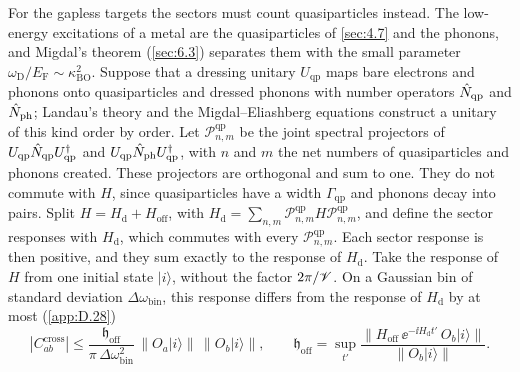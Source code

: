 For the gapless targets the sectors must count quasiparticles instead. The low-energy excitations of a metal are the quasiparticles of \cref{sec:4.7} and the phonons, and Migdal's theorem (\cref{sec:6.3}) separates them with the small parameter $\omega_{\mathrm{D}}/E_{\mathrm{F}} \sim \kappa_{\mathrm{BO}}^2$. Suppose that a dressing unitary $U_{\mathrm{qp}}$ maps bare electrons and phonons onto quasiparticles and dressed phonons with number operators $\hat{N}_{\mathrm{qp}}$ and $\hat{N}_{\mathrm{ph}}$; Landau's theory and the Migdal--Eliashberg equations construct a unitary of this kind order by order. Let $\mathcal{P}^{\mathrm{qp}}_{n,m}$ be the joint spectral projectors of $U_{\mathrm{qp}}\hat{N}_{\mathrm{qp}}U_{\mathrm{qp}}^\dagger$ and $U_{\mathrm{qp}}\hat{N}_{\mathrm{ph}}U_{\mathrm{qp}}^\dagger$, with $n$ and $m$ the net numbers of quasiparticles and phonons created. These projectors are orthogonal and sum to one. They do not commute with $H$, since quasiparticles have a width $\varGamma_{\mathrm{qp}}$ and phonons decay into pairs. Split $H = H_{\mathrm{d}} + H_{\mathrm{off}}$, with $H_{\mathrm{d}} = \sum_{n,m}\mathcal{P}^{\mathrm{qp}}_{n,m}H\mathcal{P}^{\mathrm{qp}}_{n,m}$, and define the sector responses with $H_{\mathrm{d}}$, which commutes with every $\mathcal{P}^{\mathrm{qp}}_{n,m}$. Each sector response is then positive, and they sum exactly to the response of $H_{\mathrm{d}}$. Take the response of $H$ from one initial state $|i\rangle$, without the factor $2\pi/\mathscr{V}$. On a Gaussian bin of standard deviation $\Delta\omega_{\mathrm{bin}}$, this response differs from the response of $H_{\mathrm{d}}$ by at most (\cref{app:D.28})
\begin{equation}
  |C^{\mathrm{cross}}_{ab}| \le \frac{\mathfrak{h}_{\mathrm{off}}}{\pi\,\Delta\omega_{\mathrm{bin}}^2}\,\bigl\|O_a|i\rangle\bigr\|\,\bigl\|O_b|i\rangle\bigr\| , \qquad
  \mathfrak{h}_{\mathrm{off}} = \sup_{t'}\frac{\bigl\|H_{\mathrm{off}}\,\ee^{-\ii H_{\mathrm{d}}t'}\,O_b|i\rangle\bigr\|}{\bigl\|O_b|i\rangle\bigr\|} .
  \label{eq:8.6-bin}
\end{equation}
